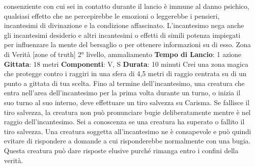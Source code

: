 \begin{multicols}{2}
consenziente con cui sei in contatto durante il lancio è
immune al danno psichico, qualsiasi effetto che ne
percepirebbe le emozioni o leggerebbe i pensieri,
incantesimi di divinazione e la condizione affascinato.
L’incantesimo nega anche gli incantesimi desiderio e
altri incantesimi o effetti di simili potenza impiegati per
influenzare la mente del bersaglio o per ottenere
informazioni su di esso.
Zona di Verità
[zone of truth]
2° livello, ammaliamento
\textbf{Tempo di Lancio}: 1 azione
\textbf{Gittata}: 18 metri
\textbf{Componenti}: V, S
\textbf{Durata}: 10 minuti
Crei una zona magica che protegge contro i raggiri in
una sfera di 4,5 metri di raggio centrata su di un punto a
gittata di tua scelta. Fino al termine dell’incantesimo,
una creatura che entra nell’area dell’incantesimo per la
prima volta durante un turno, o inizia il suo turno al suo
interno, deve effettuare un tiro salvezza su Carisma. Se
fallisce il tiro salvezza, la creatura non può pronunciare
bugie deliberatamente mentre è nel raggio
dell’incantesimo. Sei a conoscenza se una creatura ha
superato o fallito il tiro salvezza.
Una creatura soggetta all’incantesimo ne è
consapevole e può quindi evitare di rispondere a
domande a cui risponderebbe normalmente con una
bugia. Questa creatura può dare risposte elusive
purché rimanga entro i confini della verità.

\end{multicols}